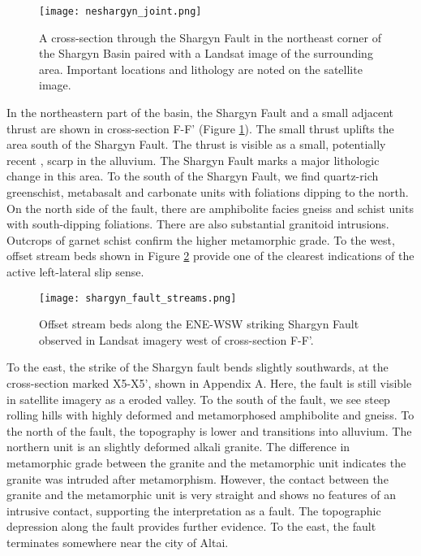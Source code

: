 \begin{figure}[p!]
  \centering
  \texttt{[image: neshargyn\_joint.png]}
  \caption{A cross-section through the Shargyn Fault in the northeast corner of the Shargyn Basin paired with a Landsat image of the surrounding area. Important locations and lithology are noted on the satellite image.}
  \label{neshargyn_joint}
\end{figure}

In the northeastern part of the basin, the Shargyn Fault and a small adjacent thrust are shown in cross-section F-F' (Figure \ref{neshargyn_joint}). The small thrust uplifts the area south of the Shargyn Fault. The thrust is visible as a small, potentially recent \citep{Bayasgalan2005a}, scarp in the alluvium. The Shargyn Fault marks a major lithologic change in this area. To the south of the Shargyn Fault, we find quartz-rich greenschist, metabasalt and carbonate units with foliations dipping to the north. On the north side of the fault, there are amphibolite facies gneiss and schist units with south-dipping foliations. There are also substantial granitoid intrusions. Outcrops of garnet schist confirm the higher metamorphic grade. To the west, offset stream beds shown in Figure \ref{shargynoffsetstreams} provide one of the clearest indications of the active left-lateral slip sense.

\begin{figure}[p!]
  \centering
  \texttt{[image: shargyn\_fault\_streams.png]}
  \caption{Offset stream beds along the ENE-WSW striking Shargyn Fault observed in Landsat imagery west of cross-section F-F'.}
  \label{shargynoffsetstreams}
\end{figure}

To the east, the strike of the Shargyn fault bends slightly southwards, at the cross-section marked X5-X5', shown in Appendix A. Here, the fault is still visible in satellite imagery as a eroded valley. To the south of the fault, we see steep rolling hills with highly deformed and metamorphosed amphibolite and gneiss. To the north of the fault, the topography is lower and transitions into alluvium. The northern unit is an slightly deformed alkali granite. The difference in metamorphic grade between the granite and the metamorphic unit indicates the granite was intruded after metamorphism. However, the contact between the granite and the metamorphic unit is very straight and shows no features of an intrusive contact, supporting the interpretation as a fault. The topographic depression along the fault provides further evidence. To the east, the fault terminates somewhere near the city of Altai. 

